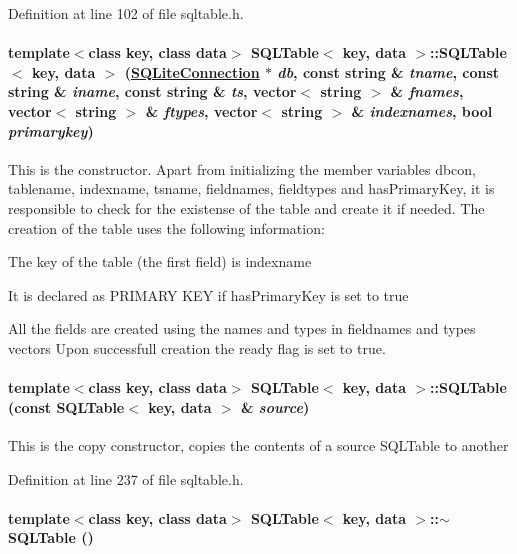 Definition at line 102 of file sqltable.h.\hypertarget{classSQLTable_SQLTablea1}{
\paragraph[SQLTable]{\setlength{\rightskip}{0pt plus 5cm}template$<$class key, class data$>$ SQLTable$<$ key, data $>$::SQLTable$<$ key, data $>$ (\hyperlink{classSQLiteConnection}{SQLite\-Connection} $\ast$ {\em db}, const string \& {\em tname}, const string \& {\em iname}, const string \& {\em ts}, vector$<$ string $>$ \& {\em fnames}, vector$<$ string $>$ \& {\em ftypes}, vector$<$ string $>$ \& {\em indexnames}, bool {\em primarykey})}\hfill}
\label{classSQLTable_SQLTablea1}


This is the constructor. Apart from initializing the member variables dbcon, tablename, indexname, tsname, fieldnames, fieldtypes and has\-Primary\-Key, it is responsible to check for the existense of the table and create it if needed. The creation of the table uses the following information:\begin{CompactItemize}
\item 
The key of the table (the first field) is indexname\item 
It is declared as PRIMARY KEY if has\-Primary\-Key is set to true\item 
All the fields are created using the names and types in fieldnames and types vectors Upon successfull creation the ready flag is set to true. \end{CompactItemize}
\hypertarget{classSQLTable_SQLTablea2}{
\paragraph[SQLTable]{\setlength{\rightskip}{0pt plus 5cm}template$<$class key, class data$>$ SQLTable$<$ key, data $>$::SQLTable (const SQLTable$<$ key, data $>$ \& {\em source})}\hfill}
\label{classSQLTable_SQLTablea2}


This is the copy constructor, copies the contents of a source SQLTable to another 

Definition at line 237 of file sqltable.h.\hypertarget{classSQLTable_SQLTablea4}{
\paragraph[$\sim$SQLTable]{\setlength{\rightskip}{0pt plus 5cm}template$<$class key, class data$>$ SQLTable$<$ key, data $>$::$\sim$SQLTable ()}\hfill}
\label{classSQLTable_SQLTablea4}





